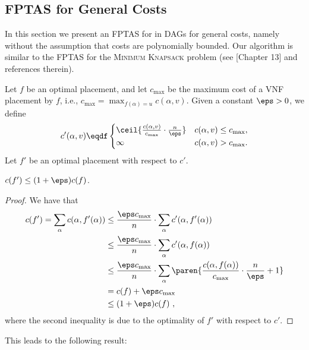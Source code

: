 
\subsection{FPTAS for General Costs}
\label{sub:fptas}

In this section we present an FPTAS for \scp in DAGs for general
costs, namely without the assumption that costs are polynomially
bounded.  Our algorithm is similar to the FPTAS for the
\textsc{Minimum Knapsack} problem (see \cite{KPP04}[Chapter 13] and
references therein).

Let $f$ be an optimal placement, and let $c_{\max}$ be the maximum
cost of a VNF placement by $f$, i.e., $c_{\max} = \max_{f(\alpha) =
  u} c(\alpha,v)$.
%
Given a constant $\eps>0$, we define
\[
c'(\alpha, v) \eqdf
\begin{cases}
\ceil{\frac{c(\alpha, v)}{c_{\max}} \cdot \frac{n}{\eps}}
       & c(\alpha, v) \leq c_{\max}, \\
\infty & c(\alpha, v) > c_{\max}.
\end{cases}
\]
Let $f'$ be an optimal placement with respect to $c'$.

\begin{lemma}
\label{lemma:guess}
$c(f') \leq (1+\eps)c(f)$.
\end{lemma}
\begin{proof}
We have that
\begin{align*}
c(f')
=    \sum_{\alpha} c(\alpha,f'(\alpha)) %
& \leq \frac{\eps c_{\max}}{n} \cdot \sum_{\alpha} c'(\alpha,f'(\alpha)) \\
& \leq \frac{\eps c_{\max}}{n} \cdot \sum_{\alpha} c'(\alpha,f(\alpha)) \\
& \leq \frac{\eps c_{\max}}{n} \cdot
     \sum_{\alpha}
       \paren{ \frac{c(\alpha,f(\alpha))}{c_{\max}} \cdot \frac{n}{\eps} + 1} \\
& =    c(f) + \eps c_{\max} \\
& \leq (1+\eps) c(f)
~,
\end{align*}
where the second inequality is due to the optimality of $f'$ with
respect to $c'$.
\end{proof}

This leads to the following result:

